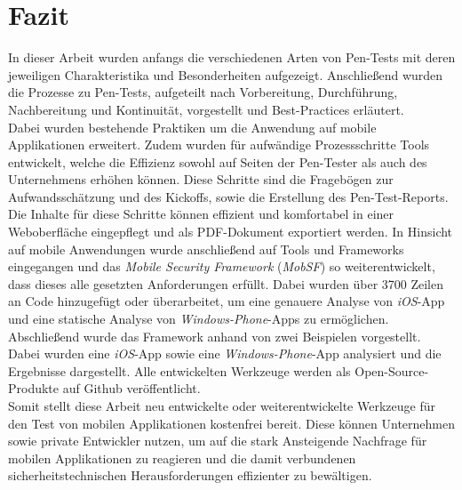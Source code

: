 \chapter{Fazit}
In dieser Arbeit wurden anfangs die verschiedenen Arten von Pen-Tests mit deren jeweiligen Charakteristika und Besonderheiten aufgezeigt. Anschließend wurden die Prozesse zu Pen-Tests, aufgeteilt nach Vorbereitung, Durchführung, Nachbereitung und Kontinuität, vorgestellt und Best-Practices erläutert.\\

Dabei wurden bestehende Praktiken um die Anwendung auf mobile Applikationen erweitert. Zudem wurden für aufwändige Prozessschritte Tools entwickelt, welche die Effizienz sowohl auf Seiten der Pen-Tester als auch des Unternehmens erhöhen können. Diese Schritte sind die Fragebögen zur Aufwandsschätzung und des Kickoffs, sowie die Erstellung des Pen-Test-Reports. Die Inhalte für diese Schritte können effizient und komfortabel in einer Weboberfläche eingepflegt und als PDF-Dokument exportiert werden. In Hinsicht auf mobile Anwendungen wurde anschließend auf Tools und Frameworks eingegangen und das \textit{Mobile Security Framework} (\textit{MobSF}) so weiterentwickelt, dass dieses alle gesetzten Anforderungen erfüllt. Dabei wurden über 3700 Zeilen an Code hinzugefügt oder überarbeitet, um eine genauere Analyse von \textit{iOS}-App und eine statische Analyse von \textit{Windows-Phone}-Apps zu ermöglichen. \\

Abschließend wurde das Framework anhand von zwei Beispielen vorgestellt. Dabei wurden eine \textit{iOS}-App sowie eine \textit{Windows-Phone}-App analysiert und die Ergebnisse dargestellt. Alle entwickelten Werkzeuge werden als Open-Source-Produkte auf Github veröffentlicht.\\

Somit stellt diese Arbeit neu entwickelte oder weiterentwickelte Werkzeuge für den Test von mobilen Applikationen kostenfrei bereit. Diese können Unternehmen sowie private Entwickler nutzen, um auf die stark Ansteigende Nachfrage für mobilen Applikationen zu reagieren und die damit verbundenen sicherheitstechnischen Herausforderungen effizienter zu bewältigen.


